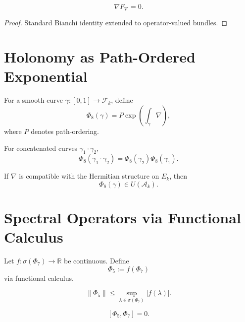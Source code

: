 \begin{lemma}
\[
\nabla F_\nabla = 0.
\]
\end{lemma}

\begin{proof}
Standard Bianchi identity extended to operator-valued bundles.
\end{proof}

\section{Holonomy as Path-Ordered Exponential}

\begin{definition}[Holonomy]
For a smooth curve $\gamma : [0,1] \to \mathcal{F}_k$, define
\[
\Phi_8(\gamma)
=
P\exp\left( \int_\gamma \nabla \right),
\]
where $P$ denotes path-ordering.
\end{definition}

\begin{lemma}
For concatenated curves $\gamma_1 \cdot \gamma_2$,
\[
\Phi_8(\gamma_1 \cdot \gamma_2)
=
\Phi_8(\gamma_2)\Phi_8(\gamma_1).
\]
\end{lemma}

\begin{lemma}
If $\nabla$ is compatible with the Hermitian structure on $E_k$, then
\[
\Phi_8(\gamma) \in U(\mathcal{A}_k).
\]
\end{lemma}

\section{Spectral Operators via Functional Calculus}

\begin{definition}
Let $f : \sigma(\Phi_7) \to \mathbb{R}$ be continuous. Define
\[
\Phi_5 := f(\Phi_7)
\]
via functional calculus.
\end{definition}

\begin{lemma}
\[
\|\Phi_5\| \le \sup_{\lambda \in \sigma(\Phi_7)} |f(\lambda)|.
\]
\end{lemma}

\begin{lemma}
\[
[\Phi_5, \Phi_7] = 0.
\]
\end{lemma}

